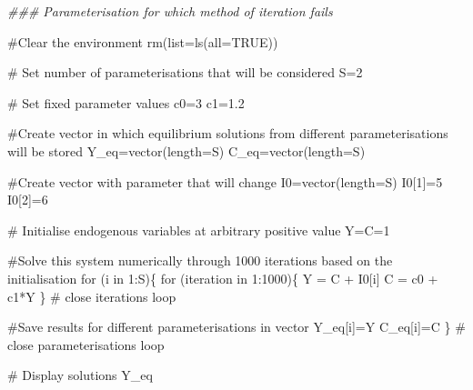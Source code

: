 \documentclass[
  letterpaper,
  DIV=11,
  numbers=noendperiod]{scrreprt}
\newenvironment{Shaded}{\begin{snugshade}}{\end{snugshade}}
\newcommand{\AttributeTok}[1]{\textcolor[rgb]{0.40,0.45,0.13}{#1}}
\newcommand{\CommentTok}[1]{\textcolor[rgb]{0.37,0.37,0.37}{#1}}
\newcommand{\ConstantTok}[1]{\textcolor[rgb]{0.56,0.35,0.01}{#1}}
\newcommand{\ControlFlowTok}[1]{\textcolor[rgb]{0.00,0.23,0.31}{#1}}
\newcommand{\DecValTok}[1]{\textcolor[rgb]{0.68,0.00,0.00}{#1}}
\newcommand{\DocumentationTok}[1]{\textcolor[rgb]{0.37,0.37,0.37}{\textit{#1}}}
\newcommand{\FloatTok}[1]{\textcolor[rgb]{0.68,0.00,0.00}{#1}}
\newcommand{\FunctionTok}[1]{\textcolor[rgb]{0.28,0.35,0.67}{#1}}
\newcommand{\NormalTok}[1]{\textcolor[rgb]{0.00,0.23,0.31}{#1}}
\newcommand{\OtherTok}[1]{\textcolor[rgb]{0.00,0.23,0.31}{#1}}
\newcommand{\SpecialCharTok}[1]{\textcolor[rgb]{0.37,0.37,0.37}{#1}}
\begin{document}
\begin{Shaded}
\begin{Highlighting}[]
\DocumentationTok{\#\#\# Parameterisation for which method of iteration fails}

\CommentTok{\#Clear the environment }
\FunctionTok{rm}\NormalTok{(}\AttributeTok{list=}\FunctionTok{ls}\NormalTok{(}\AttributeTok{all=}\ConstantTok{TRUE}\NormalTok{))}

\CommentTok{\# Set number of parameterisations that will be considered}
\NormalTok{S}\OtherTok{=}\DecValTok{2}

\CommentTok{\# Set fixed parameter values}
\NormalTok{c0}\OtherTok{=}\DecValTok{3}
\NormalTok{c1}\OtherTok{=}\FloatTok{1.2}

\CommentTok{\#Create vector in which equilibrium solutions from different parameterisations will be stored}
\NormalTok{Y\_eq}\OtherTok{=}\FunctionTok{vector}\NormalTok{(}\AttributeTok{length=}\NormalTok{S)}
\NormalTok{C\_eq}\OtherTok{=}\FunctionTok{vector}\NormalTok{(}\AttributeTok{length=}\NormalTok{S)}

\CommentTok{\#Create vector with parameter that will change }
\NormalTok{I0}\OtherTok{=}\FunctionTok{vector}\NormalTok{(}\AttributeTok{length=}\NormalTok{S)}
\NormalTok{I0[}\DecValTok{1}\NormalTok{]}\OtherTok{=}\DecValTok{5}
\NormalTok{I0[}\DecValTok{2}\NormalTok{]}\OtherTok{=}\DecValTok{6}

\CommentTok{\# Initialise endogenous variables at arbitrary positive value }
\NormalTok{Y}\OtherTok{=}\NormalTok{C}\OtherTok{=}\DecValTok{1}

\CommentTok{\#Solve this system numerically through 1000 iterations based on the initialisation}
\ControlFlowTok{for}\NormalTok{ (i }\ControlFlowTok{in} \DecValTok{1}\SpecialCharTok{:}\NormalTok{S)\{}
  \ControlFlowTok{for}\NormalTok{ (iteration }\ControlFlowTok{in} \DecValTok{1}\SpecialCharTok{:}\DecValTok{1000}\NormalTok{)\{}
\NormalTok{  Y }\OtherTok{=}\NormalTok{ C }\SpecialCharTok{+}\NormalTok{ I0[i]}
\NormalTok{  C }\OtherTok{=}\NormalTok{ c0 }\SpecialCharTok{+}\NormalTok{ c1}\SpecialCharTok{*}\NormalTok{Y}
\NormalTok{  \} }\CommentTok{\# close iterations loop}
  
\CommentTok{\#Save results for different parameterisations in vector}
\NormalTok{Y\_eq[i]}\OtherTok{=}\NormalTok{Y}
\NormalTok{C\_eq[i]}\OtherTok{=}\NormalTok{C}
\NormalTok{\} }\CommentTok{\# close parameterisations loop}

\CommentTok{\# Display solutions}
\NormalTok{Y\_eq}
\end{Highlighting}
\end{Shaded}
\end{document}
